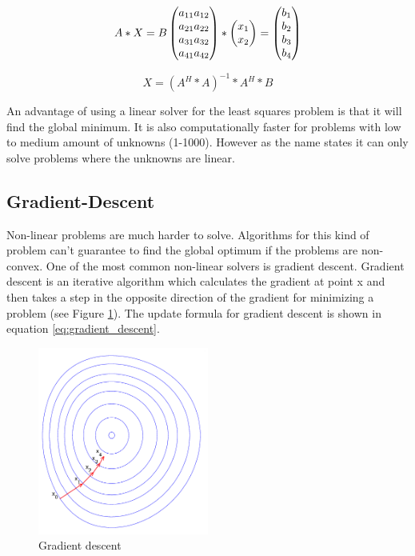 \documentclass[11pt,a4paper,titlepage,oneside]{report}
\begin{document}
\begin{equation}\label{eq:least_squares_example2}
  A*X=B \\ 
  \begin{pmatrix}
    a_{11} a_{12} \\
    a_{21} a_{22} \\
    a_{31} a_{32} \\
    a_{41} a_{42}
  \end{pmatrix}*
  \begin{pmatrix}
    x_1 \\
    x_2
  \end{pmatrix}=
  \begin{pmatrix}
    b_1 \\
    b_2 \\
    b_3 \\
    b_4
  \end{pmatrix}
\end{equation}

\begin{equation}\label{eq:least_squares_algorithm}
  X=(A^H*A)^{-1}*A^H*B 
\end{equation}

An advantage of using a linear solver for the least squares problem is that it will find the global minimum. It is also computationally faster for problems with low to medium amount of unknowns (1-1000). However as the name states it can only solve problems where the unknowns are linear.

\subsection{Gradient-Descent}
Non-linear problems are much harder to solve. Algorithms for this kind of problem can't guarantee to find the global optimum if the problems are non-convex. One of the most common non-linear solvers is gradient descent. Gradient descent is an iterative algorithm which calculates the gradient at point x and then takes a step in the opposite direction of the gradient for minimizing a problem (see Figure \ref{fig:gradient_descent}). The update formula for gradient descent is shown in equation \ref{eq:gradient_descent}.
\begin{figure}[H]
  \begin{center}
    \includegraphics[width=0.5\textwidth]{img/gradient_descent.png}
  \end{center}
    \caption{Gradient descent}\label{fig:gradient_descent}
\end{figure}
\end{document}

